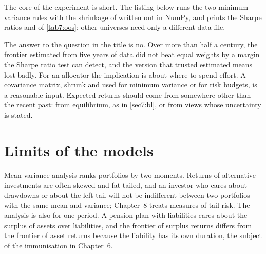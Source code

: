 \begin{chapterrefs}
The core of the experiment is short. The listing below runs the two minimum-variance rules with the
shrinkage of \textcite{ledoit2004} written out in NumPy, and prints the Sharpe ratios \csGmvSR{} and
\csLwSR{} of \cref{tab7:oos}; other universes need only a different data file.



The answer to the question in the title is no. Over more than half a century, the frontier
estimated from five years of data did not beat equal weights by a margin the Sharpe ratio test can detect, and the
version that trusted estimated means lost badly. For an allocator the implication is about where to
spend effort. A covariance matrix, shrunk and used for minimum variance or for risk budgets, is a
reasonable input. Expected returns should come from somewhere other than the recent past: from
equilibrium, as in \cref{sec7:bl}, or from views whose uncertainty is stated.

\FloatBarrier
\section{Limits of the models}
\label{sec7:limits}

Mean-variance analysis ranks portfolios by two moments. Returns of alternative investments are often
skewed and fat tailed, and an investor who cares about drawdowns or about the left tail will not be
indifferent between two portfolios with the same mean and variance; Chapter~8 treats measures of tail
risk. The analysis is also for one period. A pension plan with liabilities cares about the surplus
of assets over liabilities, and the frontier of surplus returns differs from the frontier of asset
returns because the liability has its own duration, the subject of the immunisation in Chapter~6.


\end{chapterrefs}

